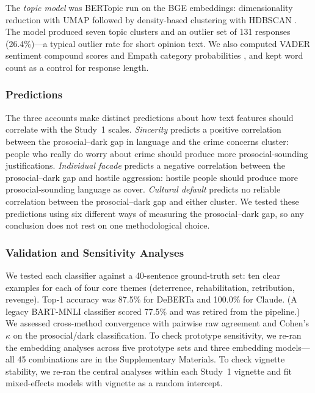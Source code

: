 The \textit{topic model} was BERTopic \citep{grootendorst2022bertopic} run on the BGE embeddings: dimensionality reduction with UMAP \citep{mcinnes2018umap} followed by density-based clustering with HDBSCAN \citep{mcinnes2017hdbscan}. The model produced seven topic clusters and an outlier set of 131 responses (26.4\%)---a typical outlier rate for short opinion text. We also computed VADER sentiment compound scores \citep{hutto2014vader} and Empath category probabilities \citep{fast2016empath}, and kept word count as a control for response length.

\subsubsection{Predictions}

The three accounts make distinct predictions about how text features should correlate with the Study~1 scales. \textit{Sincerity} predicts a positive correlation between the prosocial--dark gap in language and the crime concerns cluster: people who really do worry about crime should produce more prosocial-sounding justifications. \textit{Individual facade} predicts a negative correlation between the prosocial--dark gap and hostile aggression: hostile people should produce more prosocial-sounding language as cover. \textit{Cultural default} predicts no reliable correlation between the prosocial--dark gap and either cluster. We tested these predictions using six different ways of measuring the prosocial--dark gap, so any conclusion does not rest on one methodological choice.

\subsubsection{Validation and Sensitivity Analyses}

We tested each classifier against a 40-sentence ground-truth set: ten clear examples for each of four core themes (deterrence, rehabilitation, retribution, revenge). Top-1 accuracy was 87.5\% for DeBERTa and 100.0\% for Claude. (A legacy BART-MNLI classifier scored 77.5\% and was retired from the pipeline.) We assessed cross-method convergence with pairwise raw agreement and Cohen's $\kappa$ on the prosocial/dark classification. To check prototype sensitivity, we re-ran the embedding analyses across five prototype sets and three embedding models---all 45 combinations are in the Supplementary Materials. To check vignette stability, we re-ran the central analyses within each Study~1 vignette and fit mixed-effects models with vignette as a random intercept.

